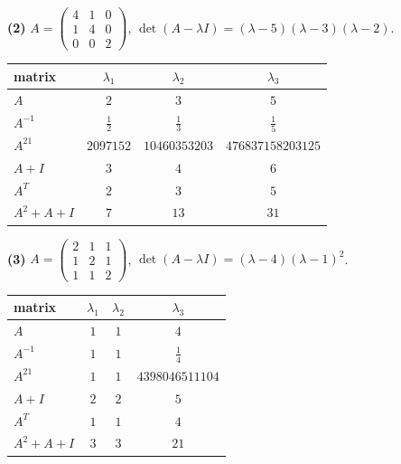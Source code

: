 \noindent\textbf{(2)} $A=\begin{pmatrix}4 & 1 & 0 \\ 1 & 4 & 0 \\ 0 & 0 & 2\end{pmatrix}$, $\det(A-\lambda I)=\left(\lambda - 5\right) \left(\lambda - 3\right) \left(\lambda - 2\right)$.
\begin{center}\begin{tabular}{l|ccc}
 matrix & $\lambda_1$ & $\lambda_2$ & $\lambda_3$ \\ \hline
$A$ & $2$ & $3$ & $5$ \\
$A^{-1}$ & $\frac{1}{2}$ & $\frac{1}{3}$ & $\frac{1}{5}$ \\
$A^{21}$ & $2097152$ & $10460353203$ & $476837158203125$ \\
$A+I$ & $3$ & $4$ & $6$ \\
$A^T$ & $2$ & $3$ & $5$ \\
$A^2+A+I$ & $7$ & $13$ & $31$ \\
\end{tabular}\end{center}

\noindent\textbf{(3)} $A=\begin{pmatrix}2 & 1 & 1 \\ 1 & 2 & 1 \\ 1 & 1 & 2\end{pmatrix}$, $\det(A-\lambda I)=\left(\lambda - 4\right) \left(\lambda - 1\right)^{2}$.
\begin{center}\begin{tabular}{l|ccc}
 matrix & $\lambda_1$ & $\lambda_2$ & $\lambda_3$ \\ \hline
$A$ & $1$ & $1$ & $4$ \\
$A^{-1}$ & $1$ & $1$ & $\frac{1}{4}$ \\
$A^{21}$ & $1$ & $1$ & $4398046511104$ \\
$A+I$ & $2$ & $2$ & $5$ \\
$A^T$ & $1$ & $1$ & $4$ \\
$A^2+A+I$ & $3$ & $3$ & $21$ \\
\end{tabular}\end{center}
